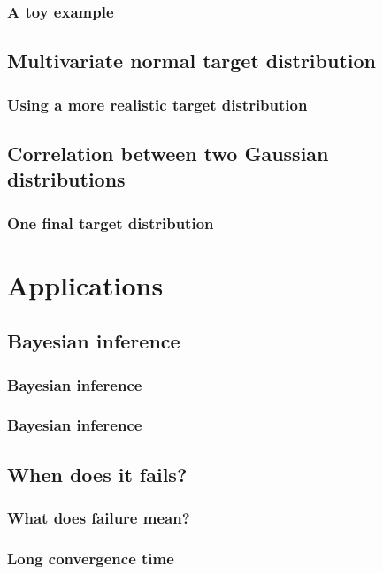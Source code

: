 \documentclass[11pt]{beamer}
\begin{document}
\begin{frame}
	\frametitle{A toy example}
\end{frame}


\subsection{Multivariate normal target distribution}


\begin{frame}
	\frametitle{Using a more realistic target distribution}
\end{frame}


\subsection{Correlation between two Gaussian distributions}


\begin{frame}
	\frametitle{One final target distribution}
\end{frame}


\section{Applications}
\subsection{Bayesian inference}


\begin{frame}
	\frametitle{Bayesian inference}
\end{frame}


\begin{frame}
	\frametitle{Bayesian inference}
\end{frame}


\subsection{When does it fails?}


\begin{frame}
	\frametitle{What does failure mean?}
\end{frame}


\begin{frame}
	\frametitle{Long convergence time}
\end{frame}
\end{document}
